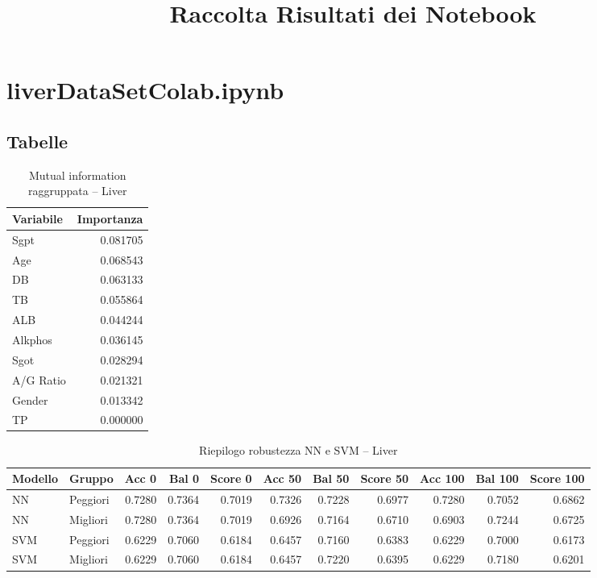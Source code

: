 \documentclass[a4paper,11pt]{article}
\begin{document}
\title{Raccolta Risultati dei Notebook}
\author{}
\date{}
\maketitle

\tableofcontents
\newpage

\section{liverDataSetColab.ipynb}

\subsection{Tabelle}

\begin{table}[H]
\centering
\caption{Mutual information raggruppata -- Liver}
\begin{tabular}{lr}
\toprule
Variabile & Importanza \\
\midrule
Sgpt & 0.081705 \\
Age & 0.068543 \\
DB & 0.063133 \\
TB & 0.055864 \\
ALB & 0.044244 \\
Alkphos & 0.036145 \\
Sgot & 0.028294 \\
A/G Ratio & 0.021321 \\
Gender & 0.013342 \\
TP & 0.000000 \\
\bottomrule
\end{tabular}
\end{table}

\begin{table}[H]
\centering
\scriptsize
\caption{Riepilogo robustezza NN e SVM -- Liver}
\begin{tabular}{llrrrrrrrrr}
\toprule
Modello & Gruppo & Acc 0 & Bal 0 & Score 0 & Acc 50 & Bal 50 & Score 50 & Acc 100 & Bal 100 & Score 100 \\
\midrule
NN & Peggiori & 0.7280 & 0.7364 & 0.7019 & 0.7326 & 0.7228 & 0.6977 & 0.7280 & 0.7052 & 0.6862 \\
NN & Migliori & 0.7280 & 0.7364 & 0.7019 & 0.6926 & 0.7164 & 0.6710 & 0.6903 & 0.7244 & 0.6725 \\
SVM & Peggiori & 0.6229 & 0.7060 & 0.6184 & 0.6457 & 0.7160 & 0.6383 & 0.6229 & 0.7000 & 0.6173 \\
SVM & Migliori & 0.6229 & 0.7060 & 0.6184 & 0.6457 & 0.7220 & 0.6395 & 0.6229 & 0.7180 & 0.6201 \\
\bottomrule
\end{tabular}
\end{table}
\end{document}
